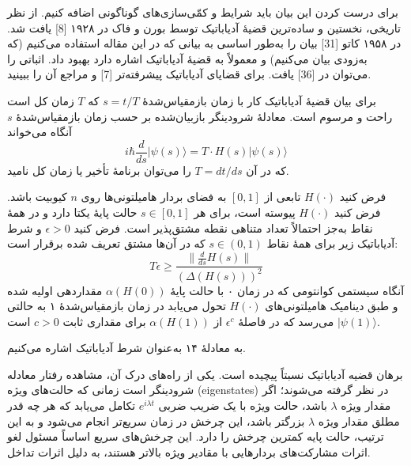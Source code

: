 برای درست کردن این بیان باید شرایط و کمّی‌سازی‌های گوناگونی اضافه کنیم. از نظر تاریخی، نخستین و ساده‌ترین قضیهٔ آدیاباتیک توسط بورن و فاک در ۱۹۲۸ [8] یافت شد. در ۱۹۵۸ کاتو [31] بیان را به‌طور اساسی به بیانی که در این مقاله استفاده می‌کنیم (که به‌زودی بیان می‌کنیم) و معمولاً به قضیهٔ آدیاباتیک اشاره دارد بهبود داد. اثباتی را می‌توان در [36] یافت. برای قضایای آدیاباتیک پیشرفته‌تر [7] و مراجع آن را ببینید.

برای بیان قضیهٔ آدیاباتیک کار با زمان بازمقیاس‌شدهٔ $s = t/T$ که $T$ زمان کل است راحت و مرسوم است. معادلهٔ شرودینگر بازبیان‌شده بر حسب زمان بازمقیاس‌شدهٔ $s$ آنگاه می‌خواند
\begin{equation}
	i\hbar \frac{d}{ds}|\psi(s)\rangle = T \cdot H(s)|\psi(s)\rangle
\end{equation}
که در آن $T = dt/ds$ را می‌توان برنامهٔ تأخیر یا زمان کل نامید.
\begin{thm}\label{thm4}
	فرض کنید $H(\cdot)$ تابعی از $[0,1]$ به فضای بردار هامیلتونی‌ها روی $n$ کیوبیت باشد. فرض کنید $H(\cdot)$ پیوسته است، برای هر $s \in [0,1]$ حالت پایهٔ یکتا دارد و در همهٔ نقاط به‌جز احتمالاً تعداد متناهی نقطه مشتق‌پذیر است. فرض کنید $\epsilon > 0$ و شرط آدیاباتیک زیر برای همهٔ نقاط $s \in (0,1)$ که در آن‌ها مشتق تعریف شده برقرار است:
\begin{equation}
		T \epsilon \ge \frac{\| \frac{d}{ds} H(s) \|}{(\Delta(H(s)))^2}
\end{equation}
	آنگاه سیستمی کوانتومی که در زمان ۰ با حالت پایهٔ $\alpha(H(0))$ مقداردهی اولیه شده و طبق دینامیک هامیلتونی‌های $H(\cdot)$ تحول می‌یابد در زمان بازمقیاس‌شدهٔ ۱ به حالتی $|\psi(1)\rangle$ می‌رسد که در فاصلهٔ $\epsilon^c$ از $\alpha(H(1))$ برای مقداری ثابت $c > 0$ است.
\end{thm}
به معادلهٔ ۱۴ به‌عنوان شرط آدیاباتیک اشاره می‌کنیم.

برهان قضیه آدیاباتیک نسبتاً پیچیده است. یکی از راه‌های درک آن، مشاهده رفتار معادله شرودینگر است زمانی که حالت‌های ویژه (eigenstates) در نظر گرفته می‌شوند؛ اگر مقدار ویژه $\lambda$ باشد، حالت ویژه با یک ضریب ضربی $e^{i\lambda t}$ تکامل می‌یابد که هر چه قدر مطلق مقدار ویژه $\lambda$ بزرگتر باشد، این چرخش در زمان سریع‌تر انجام می‌شود و به این ترتیب، حالت پایه کمترین چرخش را دارد. این چرخش‌های سریع اساساً مسئول لغو اثرات مشارکت‌های بردارهایی با مقادیر ویژه بالاتر هستند، به دلیل اثرات تداخل.
